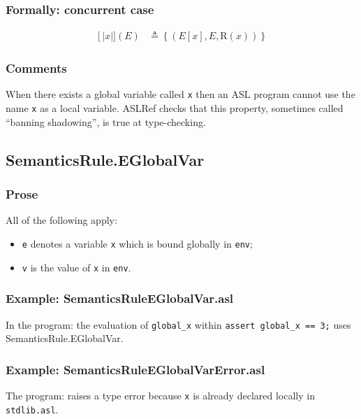 \documentclass{book}
\newcommand\llbracket{[|}
\newcommand\rrbracket{|]}
\newcommand\interp[1]{\left\llbracket #1 \right\rrbracket}
\begin{document}
  \subsubsection{Formally: concurrent case}
  \begin{align}
  \interp{x} (E) & \triangleq \left\{ (E[x], E, \text{R} (x)) \right\}
  \label{eq:sem-ndet-var}
  \end{align} 
 
  \subsubsection{Comments}
  When there exists a global variable called \texttt{x} then an ASL program
  cannot use the name \texttt{x} as a local variable. ASLRef checks that this
  property, sometimes called ``banning shadowing'', is true at type-checking.

\subsection{SemanticsRule.EGlobalVar \label{sec:SemanticsRule.EGlobalVar}}

  \subsubsection{Prose}
  All of the following apply:
  \begin{itemize}
  \item \texttt{e} denotes a variable \texttt{x} which is bound globally in \texttt{env};
  \item \texttt{v} is the value of \texttt{x} in \texttt{env}.
  \end{itemize}

  \subsubsection{Example: SemanticsRuleEGlobalVar.asl}
    In the program:
    the evaluation of \texttt{global\_x} within \texttt{assert global\_x == 3;}
    uses SemanticsRule.EGlobalVar.

  \subsubsection{Example: SemanticsRuleEGlobalVarError.asl}
    The program:
    raises a type error because \texttt{x} is already declared locally in
    \texttt{stdlib.asl}.
\end{document}
